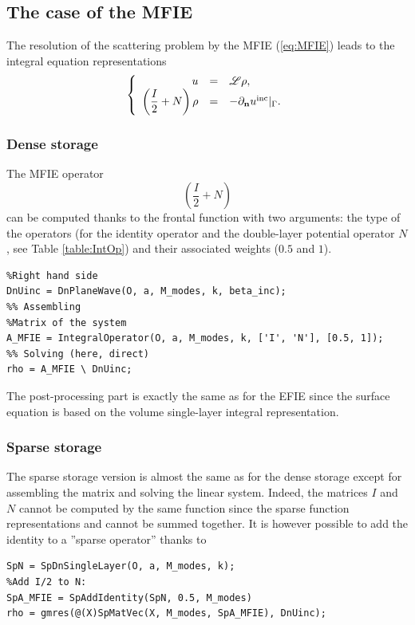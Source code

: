 \subsection{The case of the MFIE}


The resolution of the scattering problem by the MFIE (\ref{eq:MFIE}) leads to the integral equation representations
$$
\left\{\begin{array}{r c l}
u &=& {\mathscr L}\rho,\\
\displaystyle \left(\frac{I}{2}+N\right)\rho &=& -\partial_{\mathbf{n}}u^{\textrm{inc}}|_{\Gamma}.
\end{array}\right.
$$

\subsubsection{Dense storage}

The MFIE operator $$\left(\frac{I}{2}+N\right)$$ can be computed  thanks to the frontal function \IntegralOperator with two
 arguments: the type of the operators (for the identity operator and the double-layer potential operator $N$, see
  Table \ref{table:IntOp}) and their associated weights ($0.5$ and $1$). 
\begin{lstlisting}
%Right hand side
DnUinc = DnPlaneWave(O, a, M_modes, k, beta_inc);
%% Assembling
%Matrix of the system
A_MFIE = IntegralOperator(O, a, M_modes, k, ['I', 'N'], [0.5, 1]);
%% Solving (here, direct)
rho = A_MFIE \ DnUinc;
\end{lstlisting}
\medskip

The post-processing part is exactly the same as for the EFIE since the surface equation is based on the 
volume single-layer integral representation.

\subsubsection{Sparse storage}

The sparse storage version is almost the same as for the dense storage except for  assembling  the matrix and solving the linear system. Indeed, the matrices
 $I$ and $N$ cannot be computed by the same function since the sparse  function representations \SpIntegralOperator and
  \IntegralOperator cannot be  summed together. It is however possible to add the identity to a ''sparse operator'' thanks to \SpAddIdentity
\begin{lstlisting}
SpN = SpDnSingleLayer(O, a, M_modes, k);
%Add I/2 to N:
SpA_MFIE = SpAddIdentity(SpN, 0.5, M_modes)
rho = gmres(@(X)SpMatVec(X, M_modes, SpA_MFIE), DnUinc);
\end{lstlisting}
\medskip

